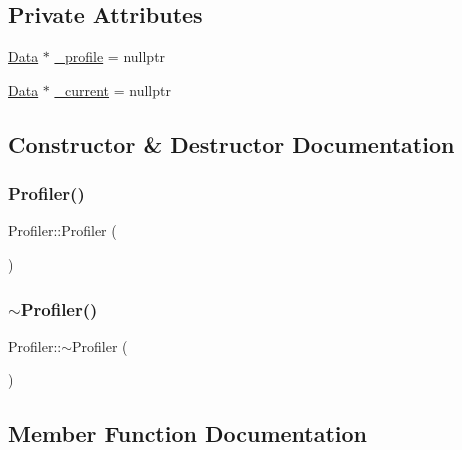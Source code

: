 \subsection*{Private Attributes}
\begin{DoxyCompactItemize}
\item 
\hyperlink{struct_profiler_1_1_data}{Data} $\ast$ \hyperlink{class_profiler_a862fb21ca07c94f5f657c7cd1a053a33}{\+\_\+profile} = nullptr
\item 
\hyperlink{struct_profiler_1_1_data}{Data} $\ast$ \hyperlink{class_profiler_a2d8b680e39756a8451e49ae51696d010}{\+\_\+current} = nullptr
\end{DoxyCompactItemize}


\subsection{Constructor \& Destructor Documentation}
\mbox{\label{class_profiler_a675ebc9207b9aeace1d967c085abeacf}} 
\subsubsection{\texorpdfstring{Profiler()}{Profiler()}}
{\footnotesize\ttfamily Profiler\+::\+Profiler (\begin{DoxyParamCaption}{ }\end{DoxyParamCaption})\hspace{0.3cm}{\ttfamily [private]}}

\mbox{\label{class_profiler_a1e6dd8f6cfb15cd5237b971d8f49c749}} 
\subsubsection{\texorpdfstring{$\sim$\+Profiler()}{~Profiler()}}
{\footnotesize\ttfamily Profiler\+::$\sim$\+Profiler (\begin{DoxyParamCaption}{ }\end{DoxyParamCaption})\hspace{0.3cm}{\ttfamily [private]}}



\subsection{Member Function Documentation}
\mbox{\label{class_profiler_af6216cfe94749776e49a0886fa91b96c}} 
